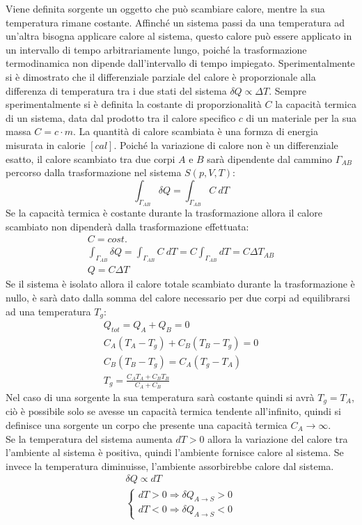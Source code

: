 \documentclass{article}
\numberwithin{equation}{subsection}
\begin{document}
Viene definita sorgente un oggetto che può scambiare calore, 
mentre la sua temperatura rimane costante. Affinché un sistema 
passi da una temperatura ad un'altra bisogna applicare calore 
al sistema, questo calore può essere applicato in un intervallo 
di tempo arbitrariamente lungo, poiché la trasformazione 
termodinamica non dipende dall'intervallo di tempo impiegato. 
Sperimentalmente si è dimostrato che il differenziale parziale 
del calore è proporzionale alla differenza di temperatura tra i 
due stati del sistema $\delta Q \propto\Delta T$. Sempre 
sperimentalmente si è definita la costante di proporzionalità 
$C$ la capacità termica di un sistema, data dal prodotto tra il 
calore specifico $c$ di un materiale per la sua massa $C=c\cdot m$. 
La quantità di calore scambiata è una formza di energia misurata 
in calorie $[cal]$. Poiché la variazione di calore non è un 
differenziale esatto, il calore scambiato tra due corpi $A$ e $B$ 
sarà 
dipendente dal cammino $\Gamma_{AB}$ percorso dalla trasformazione nel 
sistema $S(p,V,T)$:
\begin{equation}
    \displaystyle\int_{\Gamma_{AB}}\delta Q =\int_{\Gamma_{AB}}C\:dT
\end{equation}
Se la capacità termica è costante durante la trasformazione 
allora il calore scambiato non dipenderà dalla trasformazione 
effettuata:
\begin{gather}
    C=cost.\\
    \displaystyle\int_{\Gamma_{AB}}\delta Q =\int_{\Gamma_{AB}}C\:dT=C\int_{\Gamma_{AB}}dT=C\Delta T_{AB}\\
    Q=C\Delta T
\end{gather}
Se il sistema è isolato allora il calore totale scambiato 
durante la trasformazione è nullo, è sarà dato dalla 
somma del calore necessario per due corpi ad equilibrarsi 
ad una temperatura $T_g$:
\begin{gather}
    Q_{tot}=Q_A+Q_B=0\\
    C_A(T_A-T_g)+C_B(T_B-T_g)=0\\
    C_B(T_B-T_g)=C_A(T_g-T_A)\\
    T_g=\displaystyle\frac{C_AT_A+C_BT_B}{C_A+C_B}
\end{gather}
Nel caso di una sorgente la sua temperatura sarà costante 
quindi si avrà $T_g=T_A$, ciò è possibile solo se avesse 
un capacità termica tendente all'infinito, quindi si definisce 
una sorgente un corpo che presente una capacità termica $C_A\to\infty$. \\
Se la temperatura del sistema aumenta $dT>0$ allora la 
variazione del calore tra l'ambiente al sistema è positiva, 
quindi l'ambiente fornisce calore al sistema. Se invece la 
temperatura diminuisse, l'ambiente assorbirebbe calore dal 
sistema.
\begin{gather}
    \delta Q\propto dT\\
    \begin{cases}
        dT>0\Rightarrow\delta Q_{A\to S}>0\\
        dT<0\Rightarrow\delta Q_{A\to S}<0
    \end{cases}
\end{gather}
\end{document}
